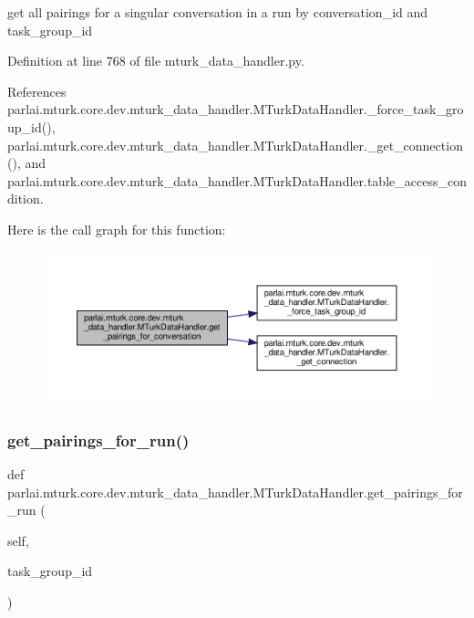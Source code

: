 \begin{DoxyVerb}get all pairings for a singular conversation in a run by
conversation_id and task_group_id
\end{DoxyVerb}
 

Definition at line 768 of file mturk\+\_\+data\+\_\+handler.\+py.



References parlai.\+mturk.\+core.\+dev.\+mturk\+\_\+data\+\_\+handler.\+M\+Turk\+Data\+Handler.\+\_\+force\+\_\+task\+\_\+group\+\_\+id(), parlai.\+mturk.\+core.\+dev.\+mturk\+\_\+data\+\_\+handler.\+M\+Turk\+Data\+Handler.\+\_\+get\+\_\+connection(), and parlai.\+mturk.\+core.\+dev.\+mturk\+\_\+data\+\_\+handler.\+M\+Turk\+Data\+Handler.\+table\+\_\+access\+\_\+condition.

Here is the call graph for this function\+:
\nopagebreak
\begin{figure}[H]
\begin{center}
\leavevmode
\includegraphics[width=350pt]{classparlai_1_1mturk_1_1core_1_1dev_1_1mturk__data__handler_1_1MTurkDataHandler_a507259114132bb247683c7f9b127c12c_cgraph}
\end{center}
\end{figure}
\mbox{\label{classparlai_1_1mturk_1_1core_1_1dev_1_1mturk__data__handler_1_1MTurkDataHandler_aac09cee0791b834add5a50e430b6030e}} 
\subsubsection{\texorpdfstring{get\+\_\+pairings\+\_\+for\+\_\+run()}{get\_pairings\_for\_run()}}
{\footnotesize\ttfamily def parlai.\+mturk.\+core.\+dev.\+mturk\+\_\+data\+\_\+handler.\+M\+Turk\+Data\+Handler.\+get\+\_\+pairings\+\_\+for\+\_\+run (\begin{DoxyParamCaption}\item[{}]{self,  }\item[{}]{task\+\_\+group\+\_\+id }\end{DoxyParamCaption})}

